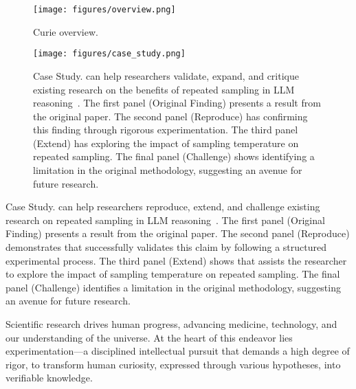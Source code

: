 \begin{figure}
    \centering
    \texttt{[image: figures/overview.png]}
    \caption{Curie overview.}
    \label{fig:curie-workflow}
\end{figure} 

\begin{figure*}
  \centering
  \texttt{[image: figures/case\_study.png]}
\caption{
Case Study. \sys can help researchers validate, expand, and critique existing research on the benefits of repeated sampling in LLM reasoning~\cite{brown2024large}. 
The first panel (Original Finding) presents a result from the original paper. 
The second panel (Reproduce) has \sys confirming this finding through rigorous experimentation.
The third panel (Extend) has \sys exploring the impact of sampling temperature on repeated sampling.
The final panel (Challenge) shows \sys identifying a limitation in the original methodology, suggesting an avenue for future research.
}
  \label{fig:case-study}
\end{figure*} 
 

Case Study. \sys can help researchers reproduce, extend, and challenge existing research on repeated sampling in LLM reasoning~\cite{brown2024large}. 
 The first panel (Original Finding) presents a result from the original paper. 
 The second panel (Reproduce) demonstrates that \sys successfully validates this claim by following a structured experimental process.
 The third panel (Extend) shows that \sys assists the researcher to explore the impact of sampling temperature on repeated sampling.
  The final panel (Challenge) identifies a limitation in the original methodology, suggesting an avenue for future research.
\fi

Scientific research drives human progress, advancing medicine, technology, and our understanding of the universe. 
At the heart of this endeavor lies experimentation—a disciplined intellectual pursuit that demands a high degree of rigor, to transform human curiosity, expressed through various hypotheses, into verifiable knowledge.

